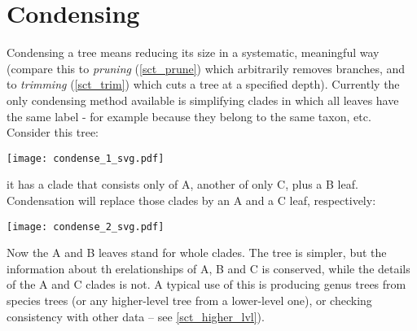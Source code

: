 \section{Condensing}
\label{sct_condense}

Condensing a tree means reducing its size in a systematic, meaningful way
(compare this to \emph{pruning} (\ref{sct_prune}) which arbitrarily removes
branches, and to \textit{trimming} (\ref{sct_trim}) which cuts a tree at a
specified depth). Currently the only condensing method available is
simplifying clades in which all leaves have the same label - for example
because they belong to the same taxon, etc. Consider this tree:

\begin{center}
\texttt{[image: condense\_1\_svg.pdf]}
\end{center}

\noindent{}it has a clade that consists only of A, another of only C, plus a B
leaf.  Condensation will replace those clades by an A and a C leaf,
respectively:


\begin{center}
\texttt{[image: condense\_2\_svg.pdf]}
\end{center}

\noindent{}Now the A and B leaves stand for whole clades. The tree is simpler,
but the information about th erelationships of A, B and C is conserved, while
the details of the A and C clades is not.  A typical use of this is producing
genus trees from species trees (or any higher-level tree from a lower-level
one), or checking consistency with other data -- see \ref{sct_higher_lvl}).

